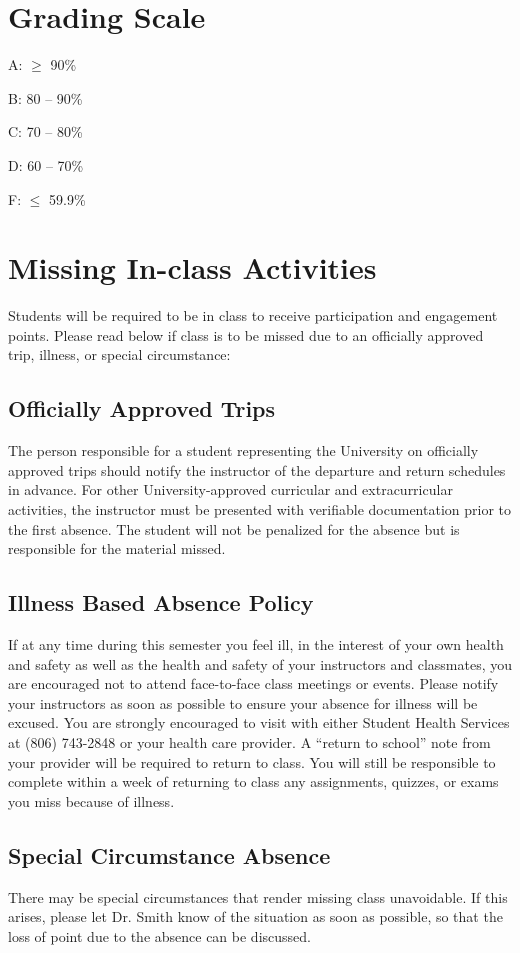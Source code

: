 \documentclass[12pt, notitlepage]{article}   	%
\begin{document}
{\section{Grading Scale}
A: $\geq$ 90\% \par
B: 80 – 90\% \par
C: 70 – 80\% \par
D: 60 – 70\% \par
F: $\leq$ 59.9\% \par

\section{Missing In-class Activities}
Students will be required to be in class to receive participation and engagement points. 
Please read below if class is to be missed due to an officially approved trip, illness, or special circumstance:

\subsection{Officially Approved Trips}
The person responsible for a student representing the University on officially 
approved trips should notify the instructor of the departure and return schedules in advance. 
For other University-approved curricular and extracurricular activities, 
the instructor must be presented with verifiable documentation prior to the first absence. 
The student will not be penalized for the absence but is responsible for the material missed.

\subsection{Illness Based Absence Policy}
If at any time during this semester you feel ill, in the interest of your own 
health and safety as well as the health and safety of your instructors and classmates, 
you are encouraged not to attend face-to-face class meetings or events. 
Please notify your instructors as soon as possible to ensure your absence for 
illness will be excused. 
You are strongly encouraged to visit with either Student Health Services at (806) 743-2848 
or your health care provider. 
A “return to school” note from your provider will be required to return to class. 
You will still be responsible to complete within a week of returning to class any 
assignments, quizzes, or exams you miss because of illness.

\subsection{Special Circumstance Absence}
There may be special circumstances that render missing class unavoidable.
If this arises, please let Dr. Smith know of the situation as soon as possible,
so that the loss of point due to the absence can be discussed.

}
\end{document}
